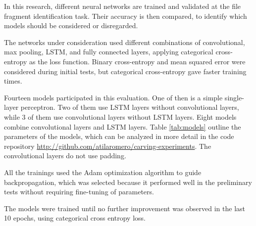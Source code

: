 In this research, different neural networks are trained and validated
at the file fragment identification task. Their accuracy is then compared,
to identify which models should be considered or disregarded.







The networks under consideration used different combinations of convolutional, max pooling, LSTM, and fully connected layers,
applying categorical cross-entropy as the loss function. Binary cross-entropy and mean squared error were considered during initial tests, but categorical cross-entropy gave faster training times.

Fourteen models participated in this evaluation. One of then is a simple single-layer perceptron. Two of them use LSTM layers without convolutional layers, while 3 of them use convolutional layers without LSTM layers. Eight models combine convolutional layers and LSTM layers. Table \ref{tab:models} outline the parameters of the models, which can be analyzed in more detail in the code repository \sloppy\url{http://github.com/atilaromero/carving-experiments}. The convolutional layers do not use padding. 



All the trainings used the Adam \cite{kingma_adam:_2014}
optimization algorithm to guide backpropagation, which was selected because it performed well in the preliminary tests without requiring fine-tuning of parameters.

The models were trained until no further improvement was observed in the last 10 epochs, using categorical cross entropy loss.


